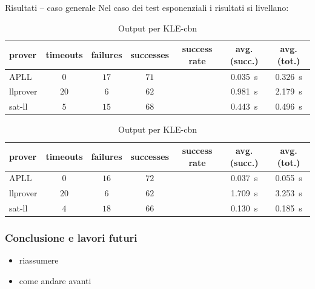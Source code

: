 \documentclass{beamer}
\begin{document}
\begin{frame}{Risultati -- caso generale}
	Nel caso dei test esponenziali i risultati si livellano:
	\begin{table}[h!]
		\begin{subtable}{\textwidth}
			\centering
			{\footnotesize
			\begin{tabular}{ | l c c c c c c | }
				\hline
				\textbf{prover} & \textbf{timeouts} & \textbf{failures} & \textbf{successes} & \textbf{success rate} & \textbf{avg. (succ.)} & \textbf{avg. (tot.)} \\
				\hline
				\hline
				APLL     & $0$  & $17$ & $71$ & \color{darkbluestatale}{$\approx 0.80$} & \qty{0.035}{\second} & \qty{0.326}{\second} \\
				llprover & $20$ & $6$  & $62$ & \color{darkbluestatale}{$\approx 0.70$} & \qty{0.981}{\second} & \qty{2.179}{\second} \\
				sat-ll   & $5$  & $15$ & $68$ & \color{darkbluestatale}{$\approx 0.77$} & \qty{0.443}{\second} & \qty{0.496}{\second} \\
				\hline
			\end{tabular}
			}
			\caption{Output per KLE-cbv}
			\label{table:KLE-cbv}
		\end{subtable}
		\begin{subtable}{\textwidth}
			\centering
			{\footnotesize
			\begin{tabular}{ | l c c c c c c | }
				\hline
				\textbf{prover} & \textbf{timeouts} & \textbf{failures} & \textbf{successes} & \textbf{success rate} & \textbf{avg. (succ.)} & \textbf{avg. (tot.)} \\
				\hline
				\hline
				APLL     & $0$  & $16$ & $72$ & \color{darkbluestatale}{$\approx 0.80$} & \qty{0.037}{\second} & \qty{0.055}{\second} \\
				llprover & $20$ & $6$  & $62$ & \color{darkbluestatale}{$\approx 0.70$} & \qty{1.709}{\second} & \qty{3.253}{\second} \\
				sat-ll   & $4$  & $18$ & $66$ & \color{darkbluestatale}{$\approx 0.75$} & \qty{0.130}{\second} & \qty{0.185}{\second} \\
				\hline
			\end{tabular}
			}
			\caption{Output per KLE-cbn}
			\label{table:KLE-cbn}
		\end{subtable}
	\end{table}
\end{frame}

\begin{frame}
  \frametitle{Conclusione e lavori futuri}
  \begin{itemize}
  \item riassumere
    
  \item come andare avanti
  \end{itemize}
\end{frame}

\backmatter[notitle]
\end{document}
